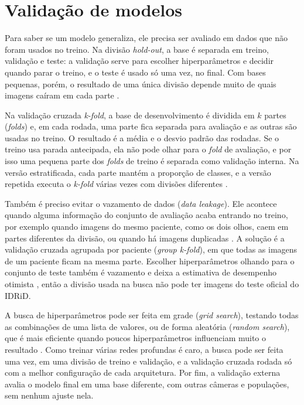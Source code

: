 \section{Validação de modelos}
\label{sec:validacao}

Para saber se um modelo generaliza, ele precisa ser avaliado em dados que não foram usados no treino. Na divisão \textit{hold-out}, a base é separada em treino, validação e teste: a validação serve para escolher hiperparâmetros e decidir quando parar o treino, e o teste é usado só uma vez, no final. Com bases pequenas, porém, o resultado de uma única divisão depende muito de quais imagens caíram em cada parte \cite{varoquaux2018cv}.

Na validação cruzada \textit{k-fold}, a base de desenvolvimento é dividida em $k$ partes (\textit{folds}) e, em cada rodada, uma parte fica separada para avaliação e as outras são usadas no treino. O resultado é a média e o desvio padrão das rodadas. Se o treino usa parada antecipada, ela não pode olhar para o \textit{fold} de avaliação, e por isso uma pequena parte dos \textit{folds} de treino é separada como validação interna. Na versão estratificada, cada parte mantém a proporção de classes, e a versão repetida executa o \textit{k-fold} várias vezes com divisões diferentes \cite{varoquaux2018cv}.

Também é preciso evitar o vazamento de dados (\textit{data leakage}). Ele acontece quando alguma informação do conjunto de avaliação acaba entrando no treino, por exemplo quando imagens do mesmo paciente, como os dois olhos, caem em partes diferentes da divisão, ou quando há imagens duplicadas \cite{kapoor2023leakage}. A solução é a validação cruzada agrupada por paciente (\textit{group k-fold}), em que todas as imagens de um paciente ficam na mesma parte. Escolher hiperparâmetros olhando para o conjunto de teste também é vazamento e deixa a estimativa de desempenho otimista \cite{varma2006bias,cawley2010overfitting}, então a divisão usada na busca não pode ter imagens do teste oficial do IDRiD.

A busca de hiperparâmetros pode ser feita em grade (\textit{grid search}), testando todas as combinações de uma lista de valores, ou de forma aleatória (\textit{random search}), que é mais eficiente quando poucos hiperparâmetros influenciam muito o resultado \cite{bergstra2012random}. Como treinar várias redes profundas é caro, a busca pode ser feita uma vez, em uma divisão de treino e validação, e a validação cruzada rodada só com a melhor configuração de cada arquitetura. Por fim, a validação externa avalia o modelo final em uma base diferente, com outras câmeras e populações, sem nenhum ajuste nela.

